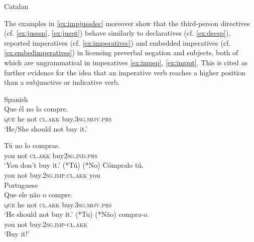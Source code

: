 \ea\label{ex:impjuss}Catalan

\z
\z

The examples in \eqref{ex:impjussdec} moreover show that the third-person directives (cf. \ref{ex:jusssp}, \ref{ex:juspt}) behave similarly to declaratives (cf. \ref{ex:decsp}), reported imperatives (cf. \ref{ex:imperativec}) and embedded imperatives (cf. \ref{ex:embedimperatives}) in licensing preverbal negation and subjects, both of which are ungrammatical in imperatives \eqref{ex:impsp}, \eqref{ex:imppt}. This is cited as  further  evidence for the idea that  an imperative verb reaches a higher position than  a subjunctive or indicative verb.

\ea\label{ex:impjussdec} Spanish\\ 
\ea\label{ex:jusssp} 
\gll Que él no lo compre. \\
\textsc{que} he not \textsc{cl.akk} buy.\textsc{3sg.sbjv.prs}\\
\glt`He/She should not buy it.'
\ex\label{ex:decsp} 

\gll Tú no lo compras. \\
you not \textsc{cl.akk} buy\textsc{2sg.ind.prs}\\
\glt`You don't buy it.'
\ex\label{ex:impsp}    \gll (*Tú) (*No) Cómpralo tú.  \\
you not {buy.\textsc{2sg.imp}.\textsc{cl.akk}} you\\
\z 
\z 
\ea
Portuguese\\ 
\ea \label{ex:juspt} 
\gll  Que ele n\~ao o compre. \\
\textsc{que} he not  \textsc{cl.akk} buy.\textsc{3sg.sbjv.prs}\\
\glt`He should not buy it.'
\ex\label{ex:imppt}
\gll (*Tu) (*N\~ao) compra-o. \\
you not buy.\textsc{2sg.imp}-\textsc{cl.akk}\\
\glt`Buy it!' 
\z
\z

